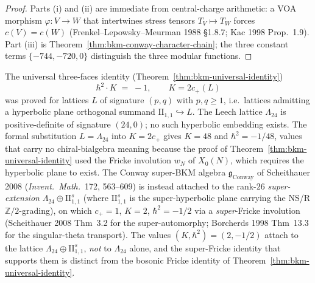 \begin{proof}
Parts (i) and (ii) are immediate from central-charge arithmetic: a
VOA morphism $\varphi\colon V\to W$ that intertwines stress tensors
$T_V\mapsto T_W$ forces $c(V) = c(W)$ (Frenkel--Lepowsky--Meurman
1988 \S1.8.7; Kac 1998 Prop.~1.9). Part (iii) is
Theorem~\ref{thm:bkm-conway-character-chain}; the three constant
terms $\{-744, -720, 0\}$ distinguish the three modular functions.
\end{proof}

\begin{theorem}
\label{thm:bkm-conway-universal-identity-fails}
The universal three-faces identity
(Theorem~\ref{thm:bkm-universal-identity})
\[
 \hbar^2 \cdot K \;=\; -1, \qquad K = 2 c_+(L)
\]
was proved for lattices $L$ of signature $(p,q)$ with $p,q\ge 1$, i.e.\
lattices admitting a hyperbolic plane orthogonal summand
$\mathrm{II}_{1,1}\hookrightarrow L$. The Leech lattice
$\Lambda_{24}$ is positive-definite of signature $(24,0)$; no such
hyperbolic embedding exists. The formal substitution
$L = \Lambda_{24}$ into $K = 2c_+$ gives $K = 48$ and
$\hbar^2 = -1/48$, values that carry no chiral-bialgebra meaning because
the proof of Theorem~\ref{thm:bkm-universal-identity} used the Fricke
involution $w_N$ of $X_0(N)$, which requires the hyperbolic plane to
exist. The Conway super-BKM algebra $\mathfrak{g}_{\mathrm{Conway}}$
of Scheithauer 2008 (\emph{Invent.\ Math.}~172, 563--609) is instead
attached to the rank-$26$ \emph{super-extension}
$\Lambda_{24}\oplus\mathrm{II}_{1,1}^{s}$ (where
$\mathrm{II}_{1,1}^{s}$ is the super-hyperbolic plane carrying the
NS/R $\mathbb{Z}/2$-grading), on which $c_+ = 1$, $K = 2$,
$\hbar^2 = -1/2$ via a \emph{super}-Fricke involution
(Scheithauer 2008 Thm~3.2 for the super-automorphy; Borcherds 1998
Thm~13.3 for the singular-theta transport). The values
$(K,\hbar^2) = (2,-1/2)$ attach to the lattice
$\Lambda_{24}\oplus\mathrm{II}_{1,1}^{s}$, \emph{not} to
$\Lambda_{24}$ alone, and the super-Fricke identity that supports them
is distinct from the bosonic Fricke identity of
Theorem~\ref{thm:bkm-universal-identity}.
\end{theorem}

